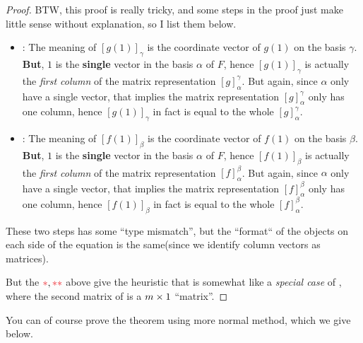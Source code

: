 \begin{proof}
BTW, this proof is really tricky, and some steps in the proof just make little sense without explanation, so I list them below.
\begin{itemize}
\item[\RED{*}]: The meaning of \([g(1)]_{\gamma}\) is the coordinate vector of \(g(1)\) on the basis \(\gamma\).
\textbf{But}, \(1\) is the \textbf{single} vector in the basis \(\alpha\) of \(F\), hence \([g(1)]_{\gamma}\) is actually the \emph{first column} of the matrix representation \([g]_{\alpha}^{\gamma}\).
But again, since \(\alpha\) only have a single vector, that implies the matrix representation \([g]_{\alpha}^{\gamma}\) only has one column, hence \([g(1)]_{\gamma}\) in fact is equal to the whole \([g]_{\alpha}^{\gamma}\).
\item[\RED{**}]: The meaning of \([f(1)]_{\beta}\) is the coordinate vector  of \(f(1)\) on the basis \(\beta\).
\textbf{But}, \(1\) is the \textbf{single} vector in the basis \(\alpha\) of \(F\), hence \([f(1)]_{\beta}\) is actually the \emph{first column} of the matrix representation \([f]_{\alpha}^{\beta}\).
But again, since \(\alpha\) only have a single vector, that implies the matrix representation \([f]_{\alpha}^{\beta}\) only has one column, hence \([f(1)]_{\beta}\) in fact is equal to the whole \([f]_{\alpha}^{\beta}\).
\end{itemize}
These two steps has some ``type mismatch'', but the ``format`` of the objects on each side of the equation is the same(since we identify column vectors as matrices).

But the \(\RED{*}, \RED{**}\) above give the heuristic that  is somewhat like a \emph{special case} of , where the second matrix of  is a \(m \times 1\) ``matrix''.
\end{proof}

You can of course prove the theorem using more normal method, which we give below.

